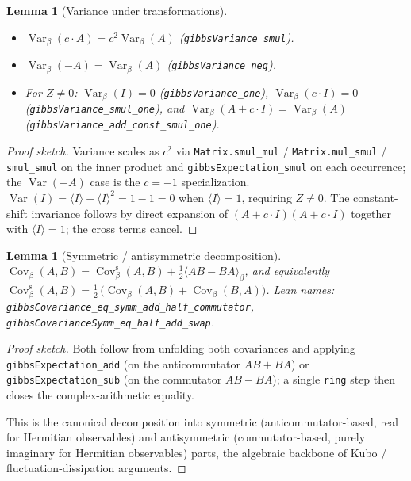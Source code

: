 \documentclass[a4paper,11pt]{article}
\newtheorem{lemma}[theorem]{Lemma}
\begin{document}
\begin{lemma}[Variance under transformations]
\begin{itemize}
  \item $\operatorname{Var}_\beta(c \cdot A) = c^2 \operatorname{Var}_\beta(A)$
    (\texttt{gibbsVariance\_smul}).
  \item $\operatorname{Var}_\beta(-A) = \operatorname{Var}_\beta(A)$
    (\texttt{gibbsVariance\_neg}).
  \item For $Z \neq 0$: $\operatorname{Var}_\beta(I) = 0$
    (\texttt{gibbsVariance\_one}),
    $\operatorname{Var}_\beta(c \cdot I) = 0$
    (\texttt{gibbsVariance\_smul\_one}), and
    $\operatorname{Var}_\beta(A + c \cdot I) = \operatorname{Var}_\beta(A)$
    (\texttt{gibbsVariance\_add\_const\_smul\_one}).
\end{itemize}
\end{lemma}

\begin{proof}[Proof sketch]
Variance scales as $c^2$ via \texttt{Matrix.smul\_mul} /
\texttt{Matrix.mul\_smul} / \texttt{smul\_smul} on the inner product
and \texttt{gibbsExpectation\_smul} on each occurrence; the
$\operatorname{Var}(-A)$ case is the $c = -1$ specialization.
$\operatorname{Var}(I) = \langle I \rangle - \langle I \rangle^2 = 1 - 1 = 0$
when $\langle I \rangle = 1$, requiring $Z \neq 0$.  The constant-shift
invariance follows by direct expansion of $(A + c \cdot I)(A + c \cdot I)$
together with $\langle I \rangle = 1$; the cross terms cancel.
\end{proof}

\begin{lemma}[Symmetric / antisymmetric decomposition]
$\operatorname{Cov}_\beta(A, B)
 = \operatorname{Cov}^{\mathrm{s}}_\beta(A, B)
 + \tfrac{1}{2} \langle A B - B A \rangle_\beta$,
and equivalently
$\operatorname{Cov}^{\mathrm{s}}_\beta(A, B)
 = \tfrac{1}{2}\,\bigl(\operatorname{Cov}_\beta(A, B)
                       + \operatorname{Cov}_\beta(B, A)\bigr)$.
Lean names: \texttt{gibbsCovariance\_eq\_symm\_add\_half\_commutator},
\texttt{gibbsCovarianceSymm\_eq\_half\_add\_swap}.
\end{lemma}

\begin{proof}[Proof sketch]
Both follow from unfolding both covariances and applying
\texttt{gibbsExpectation\_add} (on the anticommutator
$A B + B A$) or \texttt{gibbsExpectation\_sub} (on the commutator
$A B - B A$); a single \texttt{ring} step then closes the
complex-arithmetic equality.

This is the canonical decomposition into symmetric (anticommutator-based,
real for Hermitian observables) and antisymmetric (commutator-based,
purely imaginary for Hermitian observables) parts, the algebraic
backbone of Kubo / fluctuation-dissipation arguments.
\end{proof}
\end{document}
